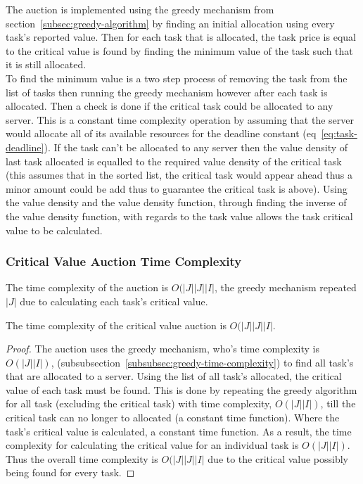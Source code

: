 The auction is implemented using the greedy mechanism from section~\ref{subsec:greedy-algorithm} by finding an initial
allocation using every task's reported value. Then for each task that is allocated, the task price is equal to the
critical value is found by finding the minimum value of the task such that it is still allocated. \\
To find the minimum value is a two step process of removing the task from the list of tasks then running the greedy
mechanism however after each task is allocated. Then a check is done if the critical task could be allocated to any
server. This is a constant time complexity operation by assuming that the server would allocate all of its available
resources for the deadline constant (eq~\ref{eq:task-deadline}). If the task can't be allocated to any server then the
value density of last task allocated is equalled to the required value density of the critical task (this assumes that
in the sorted list, the critical task would appear ahead thus a minor amount could be add thus to guarantee the
critical task is above). Using the value density and the value density function, through finding the inverse of the
value density function, with regards to the task value allows the task critical value to be calculated.

\subsubsection{Critical Value Auction Time Complexity}
\label{subsubsec:critical-value-auction-time-complexity}
The time complexity of the auction is $O(\left|J\right| \left|J\right| \left|I\right|$, the greedy
mechanism repeated $\left|J\right|$ due to calculating each task's critical value.
\begin{theorem}
    The time complexity of the critical value auction is $O(\left|J\right| \left|J\right| \left|I\right|$.
\end{theorem}
\begin{proof}
    The auction uses the greedy mechanism, who's time complexity is $O(\left|J\right| \left|I\right|)$,
    (subsubsection~\ref{subsubsec:greedy-time-complexity}) to find all task's that are allocated to a server. Using the %
    list of all task's allocated, the critical value of each task must be found. This is done by repeating the
    greedy algorithm for all task (excluding the critical task) with time complexity,
    $O(\left|J\right| \left|I\right|)$, till the critical task can no longer to allocated (a constant time function).
    Where the task's critical value is calculated, a constant time function. As a result, the time complexity for
    calculating the critical value for an individual task is $O(\left|J\right| \left|I\right|)$. Thus the overall time
    complexity is $O(\left|J\right| \left|J\right| \left|I\right|$ due to the critical value possibly being
    found for every task.
\end{proof}

